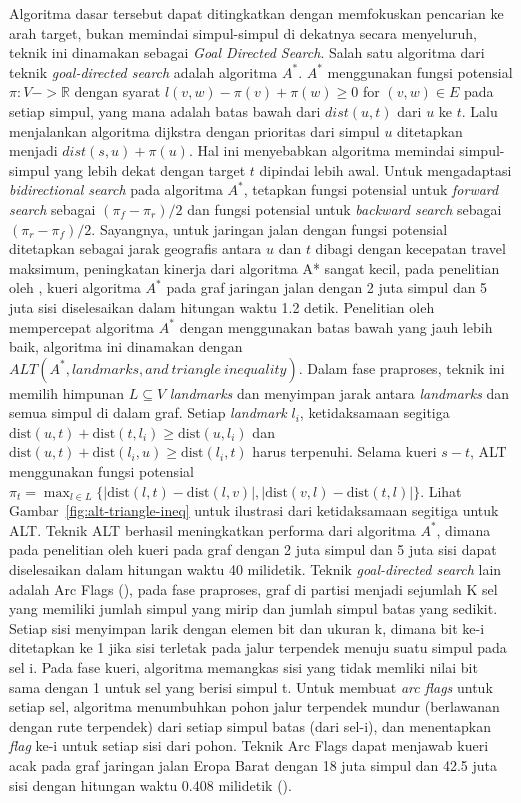 Algoritma dasar tersebut dapat ditingkatkan dengan memfokuskan pencarian ke arah target, bukan memindai simpul-simpul di dekatnya secara menyeluruh, teknik ini dinamakan sebagai \textit{Goal Directed Search}. Salah satu algoritma dari teknik \textit{goal-directed search} adalah algoritma $A^*$. $A^*$ menggunakan fungsi potensial $\pi:V->\mathbb{R}$ dengan syarat $l(v,w)-\pi(v)+\pi(w)\ge0$ for $(v,w)\in E$ pada setiap simpul, yang mana adalah batas bawah dari $dist(u,t)$ dari $u$ ke $t$. Lalu menjalankan algoritma dijkstra dengan prioritas dari simpul $u$ ditetapkan menjadi $dist(s,u)+\pi(u)$. Hal ini menyebabkan algoritma memindai simpul-simpul yang lebih dekat dengan target $t$ dipindai lebih awal. Untuk mengadaptasi \textit{bidirectional search} pada algoritma $A^*$, tetapkan fungsi potensial untuk \textit{forward search} sebagai $(\pi_f-\pi_r)/2$ dan fungsi potensial untuk \textit{backward search} sebagai $(\pi_r-\pi_f)/2$. Sayangnya, untuk jaringan jalan dengan fungsi potensial ditetapkan sebagai jarak geografis antara $u$ dan $t$ dibagi dengan kecepatan travel maksimum, peningkatan kinerja dari algoritma A* sangat kecil, pada penelitian oleh \cite{Goldberg2005}, kueri algoritma $A^*$ pada graf jaringan jalan dengan 2 juta simpul dan 5 juta sisi diselesaikan dalam hitungan waktu 1.2 detik. Penelitian oleh \cite{Goldberg2005} mempercepat algoritma $A^*$ dengan menggunakan batas bawah yang jauh lebih baik, algoritma ini dinamakan dengan $ALT(A^*,landmarks, and \ triangle \ inequality)$. Dalam fase praproses, teknik ini memilih himpunan $L\subseteq V$ \textit{landmarks} dan menyimpan jarak antara \textit{landmarks} dan semua simpul di dalam graf. Setiap \textit{landmark} $l_i$, ketidaksamaan segitiga $\text{dist}(u,t)+\text{dist}(t,l_i)\geq\text{dist}(u,l_i)$ dan $\text{dist}(u,t)+\text{dist}(l_i,u)\geq\text{dist}(l_i,t)$ harus terpenuhi. Selama kueri $s-t$, ALT menggunakan fungsi potensial $\pi_t=\max_{l \in L} \Big\{ | \text{dist}(l,t)-\text{dist}(l,v)|,|\text{dist}(v,l)-\text{dist}(t,l)|\Big\}$. Lihat Gambar~\ref{fig:alt-triangle-ineq} untuk ilustrasi dari ketidaksamaan segitiga untuk ALT. Teknik ALT berhasil meningkatkan performa dari algoritma $A^*$, dimana pada penelitian oleh \cite{Goldberg2005} kueri pada graf dengan 2 juta simpul dan 5 juta sisi dapat diselesaikan dalam hitungan waktu 40 milidetik. Teknik \textit{goal-directed search} lain adalah Arc Flags (\cite{Kohler2005}), pada fase praproses, graf di partisi menjadi sejumlah K sel yang memiliki jumlah simpul yang mirip dan jumlah simpul batas yang sedikit. Setiap sisi menyimpan larik dengan elemen bit dan ukuran k, dimana bit ke-i ditetapkan ke 1 jika sisi terletak pada jalur terpendek menuju suatu simpul pada sel i. Pada fase kueri, algoritma memangkas sisi yang tidak memliki nilai bit sama dengan 1 untuk sel yang berisi simpul t. Untuk membuat \textit{arc flags} untuk setiap sel, algoritma menumbuhkan pohon jalur terpendek mundur (berlawanan dengan rute terpendek) dari setiap simpul batas (dari sel-i), dan menentapkan \textit{flag} ke-i untuk setiap sisi dari pohon. Teknik Arc Flags dapat menjawab kueri acak pada graf jaringan jalan Eropa Barat dengan 18 juta simpul dan 42.5 juta sisi dengan hitungan waktu 0.408 milidetik (\cite{Bast2015}).

